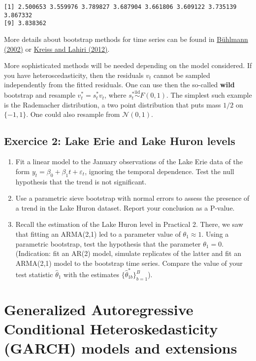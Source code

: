 \documentclass[]{book}
\providecommand{\tightlist}{%
  \setlength{\itemsep}{0pt}\setlength{\parskip}{0pt}}
\begin{document}
\begin{verbatim}
[1] 2.500653 3.559976 3.789827 3.687904 3.661806 3.609122 3.735139 3.867332
[9] 3.838362
\end{verbatim}

More details about bootstrap methods for time series can be found in
\href{https://projecteuclid.org/euclid.ss/1023798998}{Bühlmann (2002)}
or
\href{https://www.kevinsheppard.com/images/0/0a/Kreiss_and_lahiri.pdf}{Kreiss
and Lahiri (2012)}.

More sophisticated methods will be needed depending on the model
considered. If you have heteroscedasticity, then the residuals \(v_t\)
cannot be sampled independently from the fitted residuals. One can use
then the so-called \textbf{wild} bootstrap and resample
\(v_t^*=s_t^*v_t\), where \(s_t^* \stackrel{\mathrm{iid}}{\sim}F(0,1)\).
The simplest such example is the Rademacher distribution, a two point
distribution that puts mass \(1/2\) on \(\{-1, 1\}\). One could also
resample from \(\mathcal{N}(0,1)\).

\subsection{Exercice 2: Lake Erie and Lake Huron
levels}\label{exercice-2-lake-erie-and-lake-huron-levels}

\begin{enumerate}
\def\labelenumi{\arabic{enumi}.}
\tightlist
\item
  Fit a linear model to the January observations of the Lake Erie data
  of the form \(y_t=\beta_0+\beta_1t+\varepsilon_t\), ignoring the
  temporal dependence. Test the null hypothesis that the trend is not
  significant.
\item
  Use a parametric sieve bootstrap with normal errors to assess the
  presence of a trend in the Lake Huron dataset. Report your conclusion
  as a P-value.
\item
  Recall the estimation of the Lake Huron level in Practical 2. There,
  we saw that fitting an ARMA(2,1) led to a parameter value of
  \(\theta_1 \approx 1\). Using a parametric bootstrap, test the
  hypothesis that the parameter \(\theta_1=0\). (Indication: fit an
  AR(2) model, simulate replicates of the latter and fit an ARMA(2,1)
  model to the bootstrap time series. Compare the value of your test
  statistic \(\hat{\theta}_1\) with the estimates
  \(\{\hat{\theta}_{1b}^{*}\}_{b=1}^B\)).
\end{enumerate}

\section{Generalized Autoregressive Conditional Heteroskedasticity
(GARCH) models and
extensions}\label{generalized-autoregressive-conditional-heteroskedasticity-garch-models-and-extensions}
\end{document}
